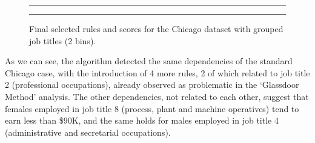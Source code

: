 \begin{itemize}
\begin{figure}[t!]
\centering
\noindent\rule{\linewidth}{0.4pt}\par
\noindent\rule{\linewidth}{0.4pt}
\caption{Final selected rules and scores for the Chicago dataset with grouped job titles (2 bins).}
\label{fig:chicago_grouped_fair-db}
\end{figure}

As we can see, the algorithm detected the same dependencies of the standard Chicago case, with the introduction of 4 more rules, 2 of which related to job title 2 (professional occupations), already observed as problematic in the `Glassdoor Method' analysis. The other dependencies, not related to each other, suggest that females employed in job title 8 (process, plant and machine operatives) tend to earn less than \$90K, and the same holds for males employed in job title 4 (administrative and secretarial occupations).


\end{itemize}
